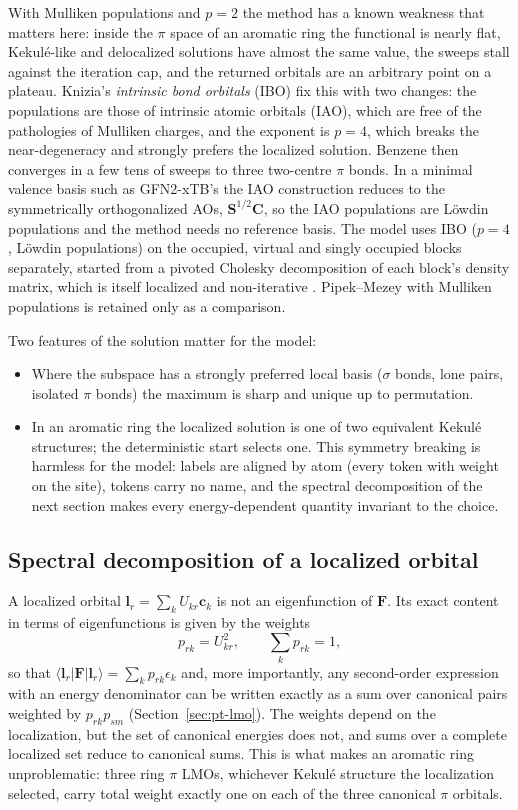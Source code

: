 \documentclass[11pt,a4paper]{article}
\newcommand{\vb}[1]{\bm{#1}}
\begin{document}
With Mulliken populations and $p=2$ the method has a known weakness that matters here: inside the $\pi$ space of an aromatic ring the functional is nearly flat, Kekul\'e-like and delocalized solutions have almost the same value, the sweeps stall against the iteration cap, and the returned orbitals are an arbitrary point on a plateau. Knizia's \emph{intrinsic bond orbitals} (IBO) \cite{ibo} fix this with two changes: the populations are those of intrinsic atomic orbitals (IAO), which are free of the pathologies of Mulliken charges, and the exponent is $p=4$, which breaks the near-degeneracy and strongly prefers the localized solution. Benzene then converges in a few tens of sweeps to three two-centre $\pi$ bonds. In a minimal valence basis such as GFN2-xTB's the IAO construction reduces to the symmetrically orthogonalized AOs, $\vb{S}^{1/2}\vb{C}$, so the IAO populations are L\"owdin populations and the method needs no reference basis. The model uses IBO ($p=4$, L\"owdin populations) on the occupied, virtual and singly occupied blocks separately, started from a pivoted Cholesky decomposition of each block's density matrix, which is itself localized and non-iterative \cite{cholesky}. Pipek--Mezey with Mulliken populations is retained only as a comparison.

Two features of the solution matter for the model:
\begin{itemize}[nosep]
\item Where the subspace has a strongly preferred local basis ($\sigma$ bonds, lone pairs, isolated $\pi$ bonds) the maximum is sharp and unique up to permutation.
\item In an aromatic ring the localized solution is one of two equivalent Kekul\'e structures; the deterministic start selects one. This symmetry breaking is harmless for the model: labels are aligned by atom (every token with weight on the site), tokens carry no name, and the spectral decomposition of the next section makes every energy-dependent quantity invariant to the choice.
\end{itemize}

\subsection{Spectral decomposition of a localized orbital}
\label{sec:spectral}
A localized orbital $\vb{l}_r=\sum_k U_{kr}\vb{c}_k$ is not an eigenfunction of $\vb{F}$. Its exact content in terms of eigenfunctions is given by the weights
\begin{equation}
p_{rk}=U_{kr}^2,\qquad \sum_k p_{rk}=1,
\label{eq:spectral-theory}
\end{equation}
so that $\langle\vb{l}_r|\vb{F}|\vb{l}_r\rangle=\sum_k p_{rk}\epsilon_k$ and, more importantly, any second-order expression with an energy denominator can be written exactly as a sum over canonical pairs weighted by $p_{rk}p_{sm}$ (Section~\ref{sec:pt-lmo}). The weights depend on the localization, but the set of canonical energies does not, and sums over a complete localized set reduce to canonical sums. This is what makes an aromatic ring unproblematic: three ring $\pi$ LMOs, whichever Kekul\'e structure the localization selected, carry total weight exactly one on each of the three canonical $\pi$ orbitals.
\end{document}
